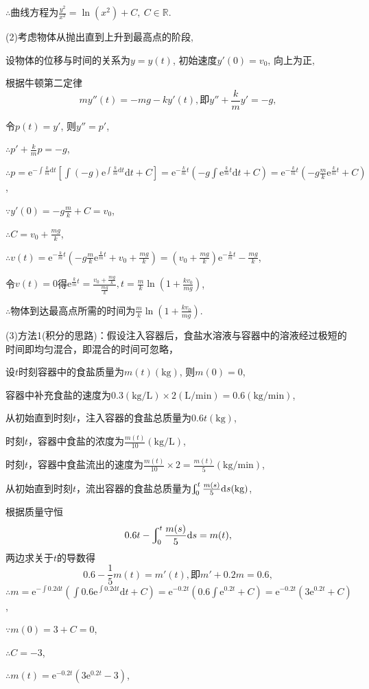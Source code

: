 \documentclass[12pt,UTF8,fleqn]{ctexart}
\newcommand{\Int}[4]{\varint\nolimits_{#1}^{#2}#3\mathrm d#4}
\newcommand{\md}[1]{\mathrm d#1}
\newcommand{\me}[0]{\mathrm e}
\begin{document}
\begin{enumerate}
$\therefore$曲线方程为$\frac{y^2}{x^2}=\ln(x^2)+C,\ C\in\mathbb R$.

(2)考虑物体从抛出直到上升到最高点的阶段,

设物体的位移与时间的关系为$y=y(t)$, 初始速度$y'(0)=v_0$, 向上为正,

根据牛顿第二定律
\[my''(t)=-mg-ky'(t),\text{即}y''+\frac kmy'=-g,\]

令$p(t)=y'$, 则$y''=p'$,

$\therefore p'+\frac kmp=-g$,

$\therefore p=\me^{-\int\frac km\md t}[\int(-g)\me^{\int\frac km\md t}\md t+C]=\me^{-\frac kmt}(-g\int\me^{\frac kmt}\md t+C)=\me^{-\frac kmt}(-g\frac mk\me^{\frac kmt}+C)$,

$\because y'(0)=-g\frac mk+C=v_0$,

$\therefore C=v_0+\frac{mg}k$,

$\therefore v(t)=\me^{-\frac kmt}(-g\frac mk\me^{\frac kmt}+v_0+\frac{mg}k)=(v_0+\frac{mg}k)\me^{-\frac kmt}-\frac{mg}k$,

令$v(t)=0$得$\me^{\frac kmt}=\frac{v_0+\frac{mg}k}{\frac{mg}k}, t=\frac mk\ln(1+\frac{kv_0}{mg})$,

$\therefore$物体到达最高点所需的时间为$\frac mk\ln(1+\frac{kv_0}{mg})$.

(3)方法1(积分的思路)：假设注入容器后，食盐水溶液与容器中的溶液经过极短的时间即均匀混合，即混合的时间可忽略，

设$t$时刻容器中的食盐质量为$m(t)(\text{kg})$, 则$m(0)=0$,

容器中补充食盐的速度为$0.3(\text{kg/L})\times2(\text{L/min})=0.6(\text{kg/min})$,

从初始直到时刻$t$，注入容器的食盐总质量为$0.6t(\text{kg})$,

时刻$t$，容器中食盐的浓度为$\frac{m(t)}{10}(\text{kg/L})$,

时刻$t$，容器中食盐流出的速度为$\frac{m(t)}{10}\times2=\frac{m(t)}5(\text{kg/min})$,

从初始直到时刻$t$，流出容器的食盐总质量为$\Int0t{\frac{m(s)}5}s(\text{kg})$,

根据质量守恒
\[0.6t-\Int0t{\frac{m(s)}5}s=m(t),\]
两边求关于$t$的导数得
\[0.6-\frac15m(t)=m'(t),\text{即}m'+0.2m=0.6,\]
$\therefore m=\me^{-\int0.2\md t}(\int0.6\me^{\int0.2\md t}\md t+C)=\me^{-0.2t}(0.6\int\me^{0.2t}+C)=\me^{-0.2t}(3\me^{0.2t}+C)$,

$\because m(0)=3+C=0$,

$\therefore C=-3$,

$\therefore m(t)=\me^{-0.2t}(3\me^{0.2t}-3)$,


\end{enumerate}
\end{document}
